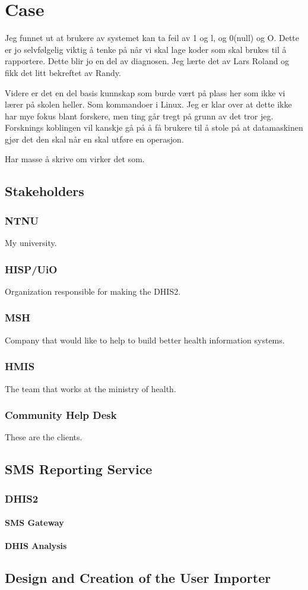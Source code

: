\chapter{Case}
Jeg funnet ut at brukere av systemet kan ta feil av 1 og l, og 0(null) og O. Dette er jo selvfølgelig viktig å tenke på når vi skal lage koder som skal brukes til å rapportere.
Dette blir jo en del av diagnosen. Jeg lærte det av Lars Roland og fikk det litt bekreftet av Randy.

Videre er det en del basis kunnskap som burde vært på plass her som ikke vi lærer på skolen heller. Som kommandoer i Linux. Jeg er klar over at dette ikke har mye fokus blant forskere, men ting går tregt på grunn av det tror jeg.
Forsknings koblingen vil kanskje gå på å få brukere til å stole på at datamaskinen gjør det den skal når en skal utføre en operasjon.

Har masse å skrive om virker det som.

\section{Stakeholders}
\subsection{NTNU}
My university.                                                                                                                                       
\subsection{HISP/UiO}
Organization responsible for making the DHIS2.
\subsection{MSH}
Company that would like to help to build better health information systems.
\subsection{HMIS}
The team that works at the ministry of health.
\subsection{Community Help Desk}
These are the clients.

\section{SMS Reporting Service}
\subsection{DHIS2}
\subsubsection{SMS Gateway}
\subsubsection{DHIS Analysis}

\section{Design and Creation of the User Importer}